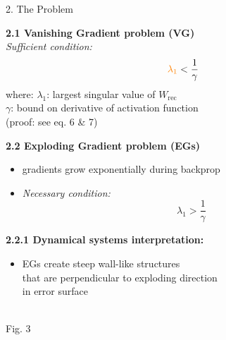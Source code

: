 \documentclass[final]{beamer}
\begin{document}
\begin{frame}[t]
\begin{columns}[t,totalwidth=\textwidth]
        \begin{column}{0.33\textwidth}
            \begin{block}{2. The Problem}
        
            \textbf{2.1 Vanishing Gradient problem (VG)}\\[0.3em]
            \textit{Sufficient condition:}
            \[
                \textcolor{orange}{\lambda_1} < \frac{1}{\gamma}
            \]
            where: $\lambda_1$: largest singular value of $W_{\text{rec}}$\\
            \phantom{where: }$\gamma$: bound on derivative of activation function\\[0.3em]
            (proof: see eq. 6 \& 7)
        
            \vspace{1em}
            \textbf{2.2 Exploding Gradient problem (EGs)}\\[-0.2em]
            \begin{itemize}
                \item gradients grow exponentially during backprop
                \item \textit{Necessary condition:}
                \[
                \lambda_1 > \frac{1}{\gamma}
                \]
            \end{itemize}
        
            \vspace{1em}
            \textbf{2.2.1 Dynamical systems interpretation:}
            \begin{itemize}
                \item EGs create steep wall-like structures\\
                    that are perpendicular to exploding direction\\
                    in error surface
            \end{itemize}
        
            \vspace{2em}
            \begin{center}
                \\[0.3em]
                Fig. 3
            \end{center}
        

\end{block}
\end{column}
\end{columns}
\end{frame}
\end{document}
